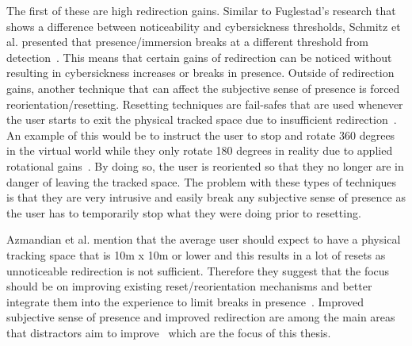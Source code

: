 The first of these are high redirection gains. Similar to Fuglestad's research that shows a difference between noticeability and cybersickness thresholds, Schmitz et al. presented that presence/immersion breaks at a different threshold from detection~\cite{schmitz2018you}. This means that certain gains of redirection can be noticed without resulting in cybersickness increases or breaks in presence.
Outside of redirection gains, another technique that can affect the subjective sense of presence is forced reorientation/resetting. Resetting techniques are fail-safes that are used whenever the user starts to exit the physical tracked space due to insufficient redirection~\cite{williams2007exploring}. An example of this would be to instruct the user to stop and rotate 360 degrees in the virtual world while they only rotate 180 degrees in reality due to applied rotational gains~\cite{suma2012taxonomy}. By doing so, the user is reoriented so that they no longer are in danger of leaving the tracked space. The problem with these types of techniques is that they are very intrusive and easily break any subjective sense of presence as the user has to temporarily stop what they were doing prior to resetting. 

Azmandian et al. mention that the average user should expect to have a physical tracking space that is 10m x 10m or lower and this results in a lot of resets as unnoticeable redirection is not sufficient. Therefore they suggest that the focus should be on improving existing reset/reorientation mechanisms and better integrate them into the experience to limit breaks in presence~\cite{azmandian2015physical}. Improved subjective sense of presence and improved redirection are among the main areas that distractors aim to improve~\cite{peck2009evaluation, peck2011evaluation} which are the focus of this thesis.

